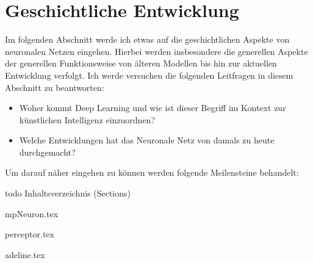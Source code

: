 \part{Geschichtliche Entwicklung}

Im folgenden Abschnitt werde ich etwas auf die geschichtlichen Aspekte von neuronalen Netzen eingehen. Hierbei werden insbesondere die generellen Aspekte der generellen Funktionsweise von älteren Modellen bis hin zur aktuellen Entwicklung verfolgt. Ich werde versuchen die folgenden Leitfragen in diesem Abschnitt zu beantworten: 

\begin{itemize}
\item Woher kommt Deep Learning und wie ist dieser Begriff im Kontext zur künstlichen Intelligenz einzuordnen?
\item Welche Entwicklungen hat das Neuronale Netz von damals zu heute durchgemacht?
\end{itemize}

Um darauf näher eingehen zu können werden folgende Meilensteine behandelt: 

todo Inhaltsverzeichnis (Sections)

{mpNeuron.tex}
\FloatBarrier
\pagebreak

{perceptor.tex}
\FloatBarrier
\pagebreak

{adeline.tex}
